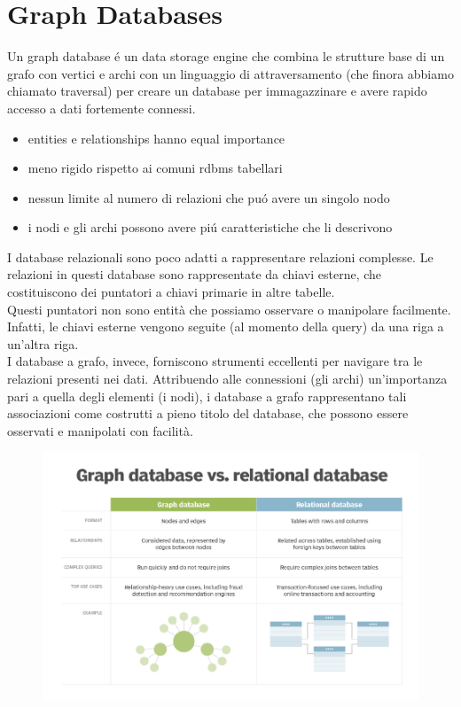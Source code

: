 \section{Graph Databases}
Un graph database é un data storage engine che combina le strutture base di un grafo con vertici e archi con un linguaggio di attraversamento (che finora abbiamo chiamato traversal) per creare un database per immagazzinare e avere rapido accesso a dati fortemente connessi. 
\begin{itemize}
    \item entities e relationships hanno equal importance
    \item meno rigido rispetto ai comuni rdbms tabellari
    \item nessun limite al numero di relazioni che puó avere un singolo nodo
    \item i nodi e gli archi possono avere piú caratteristiche che li descrivono
\end{itemize}
I database relazionali sono poco adatti a rappresentare relazioni complesse. Le relazioni in questi database sono rappresentate da chiavi esterne, che costituiscono dei puntatori a chiavi primarie in altre tabelle.
\\
Questi puntatori non sono entità che possiamo osservare o manipolare facilmente. Infatti, le chiavi esterne vengono seguite (al momento della query) da una riga a un'altra riga.
\\
I database a grafo, invece, forniscono strumenti eccellenti per navigare tra le relazioni presenti nei dati. Attribuendo alle connessioni (gli archi) un'importanza pari a quella degli elementi (i nodi), i database a grafo rappresentano tali associazioni come costrutti a pieno titolo del database, che possono essere osservati e manipolati con facilità.
\begin{figure}[th]
    \centering
    \includegraphics[scale=0.5]{GraphDatabase//img/graphvsrdbms.png}
\end{figure}
